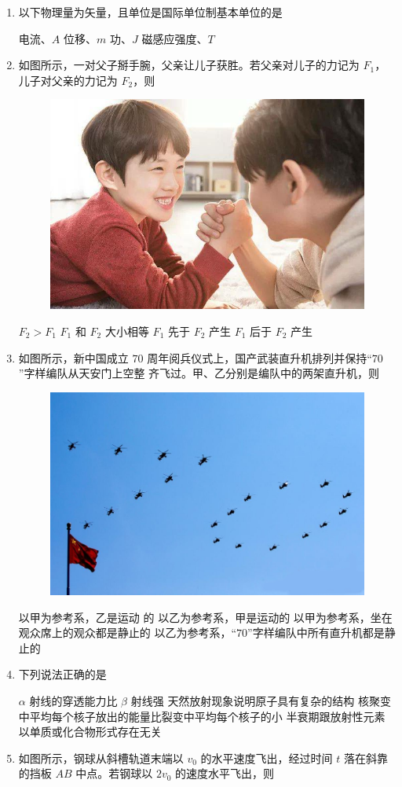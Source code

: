 \gaokaoxz




\begin{enumerate}
\item
以下物理量为矢量，且单位是国际单位制基本单位的是  


\fourchoices
{电流、$ A $}
{位移、$ m $}
{功、$ J $}
{磁感应强度、$ T $}

\item
如图所示，一对父子掰手腕，父亲让儿子获胜。若父亲对儿子的力记为 $ F_{1} $，儿子对父亲的力记为 $ F_{2} $，则  
\begin{figure}[h!]
\centering
\includegraphics[width=0.23\linewidth]{picture/screenshot083}
\end{figure}


\fourchoices
{$ F_{2} > F_{1} $}
{$ F_{1} $ 和 $ F_{2} $ 大小相等}
{$ F_{1} $ 先于 $ F_{2} $ 产生}
{$ F_{1} $ 后于 $ F_{2} $ 产生}


\item
如图所示，新中国成立 $ 70 $ 周年阅兵仪式上，国产武装直升机排列并保持“$ 70 $”字样编队从天安门上空整
齐飞过。甲、乙分别是编队中的两架直升机，则  
\begin{figure}[h!]
\centering
\includegraphics[width=0.23\linewidth]{picture/screenshot084}
\end{figure}


\fourchoices
{以甲为参考系，乙是运动 的}
{以乙为参考系，甲是运动的}
{以甲为参考系，坐在观众席上的观众都是静止的}
{以乙为参考系，“$ 70 $”字样编队中所有直升机都是静止的}


\item
下列说法正确的是  


\fourchoices
{$ \alpha $ 射线的穿透能力比 $ \beta $ 射线强}
{天然放射现象说明原子具有复杂的结构}
{核聚变中平均每个核子放出的能量比裂变中平均每个核子的小}
{半衰期跟放射性元素以单质或化合物形式存在无关}

\newpage
\item
如图所示，钢球从斜槽轨道末端以 $ v_{0} $ 的水平速度飞出，经过时间 $ t $ 落在斜靠的挡板 $ AB $ 中点。若钢球以 $ 2 v_{0} $
的速度水平飞出，则  
\begin{figure}[h!]
\centering

\end{figure}


\end{enumerate}
